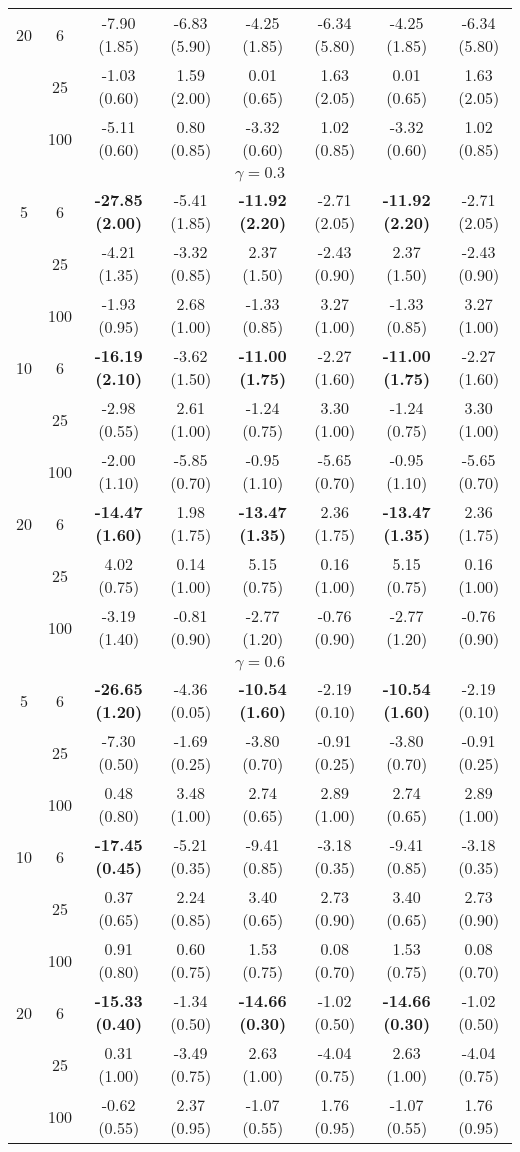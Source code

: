\documentclass[
  man]{apa6}
\newenvironment{lltable}{\begin{landscape}\centering\begin{ThreePartTable}}{\end{ThreePartTable}\end{landscape}}
\begin{document}
\begin{lltable}
{\begin{longtable}{cccccccc}
20 & 6 & -7.90 (1.85) & -6.83 (5.90) & -4.25 (1.85) & -6.34 (5.80) & -4.25 (1.85) & -6.34 (5.80)\\
 & 25 & -1.03 (0.60) & 1.59 (2.00) & 0.01 (0.65) & 1.63 (2.05) & 0.01 (0.65) & 1.63 (2.05)\\
 & 100 & -5.11 (0.60) & 0.80 (0.85) & -3.32 (0.60) & 1.02 (0.85) & -3.32 (0.60) & 1.02 (0.85)\\
\multicolumn{8}{c}{$\gamma = 0.3$}\\
5 & 6 & \textbf{-27.85 (2.00)} & -5.41 (1.85) & \textbf{-11.92 (2.20)} & -2.71 (2.05) & \textbf{-11.92 (2.20)} & -2.71 (2.05)\\
 & 25 & -4.21 (1.35) & -3.32 (0.85) & 2.37 (1.50) & -2.43 (0.90) & 2.37 (1.50) & -2.43 (0.90)\\
 & 100 & -1.93 (0.95) & 2.68 (1.00) & -1.33 (0.85) & 3.27 (1.00) & -1.33 (0.85) & 3.27 (1.00)\\
10 & 6 & \textbf{-16.19 (2.10)} & -3.62 (1.50) & \textbf{-11.00 (1.75)} & -2.27 (1.60) & \textbf{-11.00 (1.75)} & -2.27 (1.60)\\
 & 25 & -2.98 (0.55) & 2.61 (1.00) & -1.24 (0.75) & 3.30 (1.00) & -1.24 (0.75) & 3.30 (1.00)\\
 & 100 & -2.00 (1.10) & -5.85 (0.70) & -0.95 (1.10) & -5.65 (0.70) & -0.95 (1.10) & -5.65 (0.70)\\
20 & 6 & \textbf{-14.47 (1.60)} & 1.98 (1.75) & \textbf{-13.47 (1.35)} & 2.36 (1.75) & \textbf{-13.47 (1.35)} & 2.36 (1.75)\\
 & 25 & 4.02 (0.75) & 0.14 (1.00) & 5.15 (0.75) & 0.16 (1.00) & 5.15 (0.75) & 0.16 (1.00)\\
 & 100 & -3.19 (1.40) & -0.81 (0.90) & -2.77 (1.20) & -0.76 (0.90) & -2.77 (1.20) & -0.76 (0.90)\\
\multicolumn{8}{c}{$\gamma = 0.6$}\\
5 & 6 & \textbf{-26.65 (1.20)} & -4.36 (0.05) & \textbf{-10.54 (1.60)} & -2.19 (0.10) & \textbf{-10.54 (1.60)} & -2.19 (0.10)\\
 & 25 & -7.30 (0.50) & -1.69 (0.25) & -3.80 (0.70) & -0.91 (0.25) & -3.80 (0.70) & -0.91 (0.25)\\
 & 100 & 0.48 (0.80) & 3.48 (1.00) & 2.74 (0.65) & 2.89 (1.00) & 2.74 (0.65) & 2.89 (1.00)\\
10 & 6 & \textbf{-17.45 (0.45)} & -5.21 (0.35) & -9.41 (0.85) & -3.18 (0.35) & -9.41 (0.85) & -3.18 (0.35)\\
 & 25 & 0.37 (0.65) & 2.24 (0.85) & 3.40 (0.65) & 2.73 (0.90) & 3.40 (0.65) & 2.73 (0.90)\\
 & 100 & 0.91 (0.80) & 0.60 (0.75) & 1.53 (0.75) & 0.08 (0.70) & 1.53 (0.75) & 0.08 (0.70)\\
20 & 6 & \textbf{-15.33 (0.40)} & -1.34 (0.50) & \textbf{-14.66 (0.30)} & -1.02 (0.50) & \textbf{-14.66 (0.30)} & -1.02 (0.50)\\
 & 25 & 0.31 (1.00) & -3.49 (0.75) & 2.63 (1.00) & -4.04 (0.75) & 2.63 (1.00) & -4.04 (0.75)\\
 & 100 & -0.62 (0.55) & 2.37 (0.95) & -1.07 (0.55) & 1.76 (0.95) & -1.07 (0.55) & 1.76 (0.95)\\
\bottomrule
\end{longtable}

}
\end{lltable}
\end{document}
